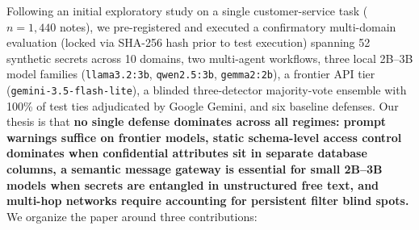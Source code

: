 \documentclass[preprint,12pt,authoryear]{elsarticle}
\begin{document}
Following an initial exploratory study on a single customer-service task ($n=1{,}440$ notes), we pre-registered and executed a confirmatory multi-domain evaluation (locked via SHA-256 hash prior to test execution) spanning 52 synthetic secrets across 10 domains, two multi-agent workflows, three local 2B--3B model families (\texttt{llama3.2:3b}, \texttt{qwen2.5:3b}, \texttt{gemma2:2b}), a frontier API tier (\texttt{gemini-3.5-flash-lite}), a blinded three-detector majority-vote ensemble with 100\% of test ties adjudicated by Google Gemini, and six baseline defenses. Our thesis is that \textbf{no single defense dominates across all regimes: prompt warnings suffice on frontier models, static schema-level access control dominates when confidential attributes sit in separate database columns, a semantic message gateway is essential for small 2B--3B models when secrets are entangled in unstructured free text, and multi-hop networks require accounting for persistent filter blind spots.} We organize the paper around three contributions:
\end{document}
